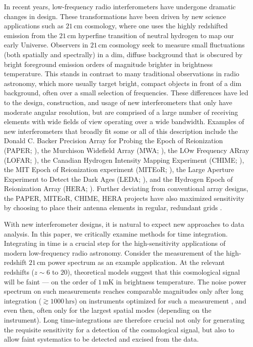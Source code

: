 \documentclass[twocolumn,apj,numberedappendix]{emulateapj}
\begin{document}
In recent years, low-frequency radio interferometers have undergone dramatic changes in design.
These transformations have been driven by new science applications such as $21\,\textrm{cm}$
cosmology, where one uses the highly redshifted emission from the $21\,\textrm{cm}$ hyperfine transition
of neutral hydrogen to map our early Universe. Observers in $21\,\textrm{cm}$ cosmology seek to
measure small fluctuations (both spatially and spectrally) in a dim, diffuse background that is obscured by bright
foreground emission orders of magnitude brighter in brightness temperature. This stands
in contrast to many traditional observations in radio astronomy, which more usually target bright,
compact objects in front of a dim background, often over a small selection of frequencies. These differences have led to the design, construction, 
and usage of new interferometers that only have moderate angular resolution, but are comprised of a
large number of receiving elements with wide fields of view operating over a wide bandwidth. Examples of new interferometers that broadly fit some or all of this description include the Donald C. Backer Precision Array for Probing the Epoch of Reionization (PAPER; \citealt{parsons_et_al2010}), the Murchison Widefield Array (MWA; \citealt{tingay_et_al2013,bowman_et_al2012}), the LOw Frequency ARray (LOFAR; \citealt{van_haarlem_et_al2013}), the Canadian Hydrogen Intensity Mapping Experiment (CHIME; \citealt{bandura_et_al2014}), the MIT Epoch of Reionization experiment (MITEoR; \citealt{zheng_et_al2014}), the Large Aperture Experiment to Detect the 
Dark Ages (LEDA; \citealt{greenhill_et_al2012}), and the Hydrogen Epoch of Reionization
Array (HERA; \citealt{pober_et_al2014}). Further deviating from conventional array
designs, the PAPER, MITEoR, CHIME, HERA projects have also maximized sensitivity by choosing to place their antenna elements in regular, redundant grids \citep{parsons_et_al2012a}.

With new interferometer designs, it is natural to expect new approaches to data analysis. In this paper,
we critically examine methods for time integration. Integrating in time is a crucial step for the
high-sensitivity applications of modern low-frequency radio astronomy. Consider the measurement of
the high-redshift $21\,\textrm{cm}$ power spectrum as an example application. At the relevant redshifts ($z\sim 6$ to $20$), theoretical models suggest that this cosmological signal will be faint --- on the order of $1\,\textrm{mK}$ in brightness temperature. The noise power spectrum on such
measurements reaches comparable magnitudes only after long integration ($\gtrsim 1000\,\textrm{hrs}$)
on instruments optimized for such a measurement \citep{harker_et_al2010,parsons_et_al2012a,beardsley_et_al2013,pober_et_al2014}, and even then, often only for the largest spatial modes (depending on the instrument).
Long time-integrations are therefore crucial not only for generating the requisite sensitivity for a
detection of the cosmological signal, but also to allow faint systematics to be detected and excised
from the data.
\end{document}
